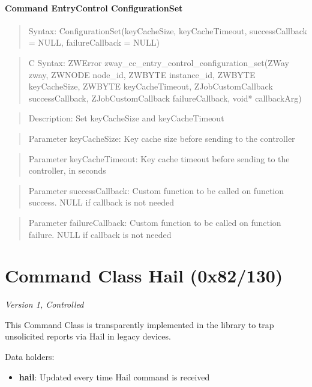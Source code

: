 \paragraph{Command EntryControl ConfigurationSet}
\begin{quote}Syntax: ConfigurationSet(keyCacheSize, keyCacheTimeout, successCallback = NULL, failureCallback = NULL)\end{quote}
\begin{quote}C Syntax: ZWError zway\_cc\_entry\_control\_configuration\_set(ZWay zway, ZWNODE node\_id, ZWBYTE instance\_id, ZWBYTE keyCacheSize, ZWBYTE keyCacheTimeout, ZJobCustomCallback successCallback, ZJobCustomCallback failureCallback, void* callbackArg)\end{quote}
\begin{quote}Description: Set keyCacheSize and keyCacheTimeout\end{quote}
\begin{quote}Parameter keyCacheSize: Key cache size before sending to the controller\end{quote}
\begin{quote}Parameter keyCacheTimeout: Key cache timeout before sending to the controller, in seconds\end{quote}
\begin{quote}Parameter successCallback: Custom function to be called on function success. NULL if callback is not needed\end{quote}
\begin{quote}Parameter failureCallback: Custom function to be called on function failure. NULL if callback is not needed\end{quote}



\section{Command Class Hail (0x82/130)}

\textit{Version 1, Controlled}
\newline

This Command Class is transparently implemented in the library to trap unsolicited reports via Hail in legacy devices.
\newline

\noindent
Data holders:

\begin{itemize}
\item \textbf{hail}: Updated every time Hail command is received
\end{itemize}


